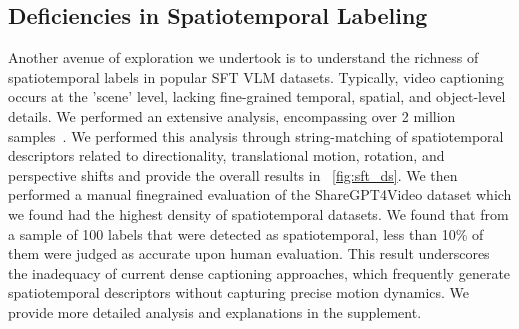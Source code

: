 \subsection{Deficiencies in Spatiotemporal Labeling}
Another avenue of exploration we undertook is to understand the richness of spatiotemporal labels in popular SFT VLM datasets. Typically, video captioning occurs at the 'scene' level, lacking fine-grained temporal, spatial, and object-level details. We performed an extensive analysis, encompassing over 2 million samples~\cite{chen2024sharegpt4video, cui2025comprehensive, 2023videochat, li2023mvbench, zhang2024llavanext-video}. We performed this analysis through string-matching of spatiotemporal descriptors related to directionality, translational motion, rotation, and perspective shifts and provide the overall results in ~\cref{fig:sft_ds}. We then performed a manual finegrained evaluation of the ShareGPT4Video dataset \cite{chen2024sharegpt4video} which we found had the highest density of spatiotemporal datasets. We found that from a sample of 100 labels that were detected as spatiotemporal, less than 10\% of them were judged as accurate upon human evaluation. This result underscores the inadequacy of current dense captioning approaches, which frequently generate spatiotemporal descriptors without capturing precise motion dynamics. We provide more detailed analysis and explanations in the supplement.

